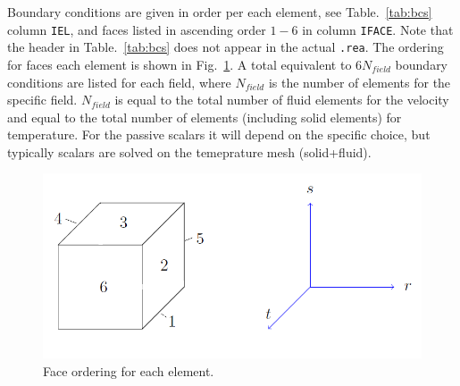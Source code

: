 \begin{description}
Boundary conditions are given in order per each element, see Table.~\ref{tab:bcs} column \texttt{IEL}, and faces listed in ascending order $1-6$ in column \texttt{IFACE}. Note that the header in Table.~\ref{tab:bcs} does not appear in the actual \texttt{.rea}.
The ordering for faces each element is shown in Fig.~\ref{fig:forder}. A total equivalent to $6N_{field}$ boundary conditions are listed for each field, where $N_{field}$ is the number of elements for the specific field. $N_{field}$ is equal to the total number of fluid elements for the velocity and equal to the total number of elements (including solid elements) for temperature. For the passive scalars it will depend on the specific choice, but typically scalars are solved on the temeprature mesh (solid+fluid). 

\begin{figure}
\begin{center}
\includegraphics[scale=0.5]{Figs/3dcube_2.png}
\caption{Face ordering for each element.}
\label{fig:forder}
\end{center}
\end{figure}


\end{description}
